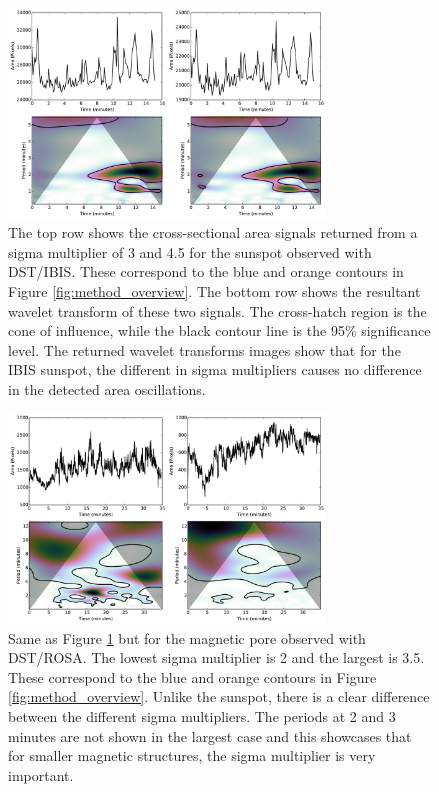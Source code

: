     \begin{figure}
        \centering
        \includegraphics[width=0.75\textwidth]{sunspot_wavelet.pdf}
        \caption{
            The top row shows the cross-sectional area signals returned from a sigma multiplier of 3 and 4.5 for the sunspot observed with DST/IBIS.
            These correspond to the blue and orange contours in Figure \ref{fig:method_overview}.
            The bottom row shows the resultant wavelet transform of these two signals.
            The cross-hatch region is the cone of influence, while the black contour line is the 95\% significance level.
            The returned wavelet transforms images show that for the IBIS sunspot, the different in sigma multipliers causes no difference in the detected area oscillations.
        }
        \label{fig:sunspot_wavelet}
    \end{figure}
    
    \begin{figure}
        \centering
        \includegraphics[width=0.75\textwidth]{pore_wavelet.pdf}
        \caption{
            Same as Figure \ref{fig:sunspot_wavelet} but for the magnetic pore observed with DST/ROSA.
            The lowest sigma multiplier is 2 and the largest is 3.5. 
            These correspond to the blue and orange contours in Figure \ref{fig:method_overview}.
            Unlike the sunspot, there is a clear difference between the different sigma multipliers.
            The periods at 2 and 3 minutes are not shown in the largest case and this showcases that for smaller magnetic structures, the sigma multiplier is very important. 
        }
        \label{fig:pore_wavelet}
    \end{figure}
    
